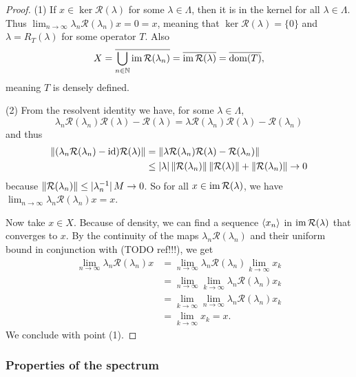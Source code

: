 \begin{proof}
(1) If $x\in \ker\mathcal{R}(\lambda)$ for some $\lambda\in\Lambda$, then it is in the kernel for all $\lambda\in\Lambda$. Thus $\lim_{n\to\infty}\lambda_n\mathcal{R}(\lambda_n)x = 0 = x$, meaning that $\ker\mathcal{R}(\lambda) = \{0\}$ and $\mathcal{\lambda} = R_T(\lambda)$ for some operator $T$. Also
\[ X = \overline{\bigcup_{n\in\mathbb{N}}\operatorname{im}\mathcal{R}(\lambda_n)} = \overline{\operatorname{im}\mathcal{R}(\lambda)} = \overline{\operatorname{dom}(T)}, \]
meaning $T$ is densely defined.

(2) From the resolvent identity we have, for some $\lambda\in \Lambda$,
\[ \lambda_n\mathcal{R}(\lambda_n)\mathcal{R}(\lambda) - \mathcal{R}(\lambda) = \lambda\mathcal{R}(\lambda_n)\mathcal{R}(\lambda) - \mathcal{R}(\lambda_n) \]
and thus
\begin{align*}
\lVert(\lambda_n\mathcal{R}(\lambda_n) - \operatorname{id})\mathcal{R}(\lambda)\rVert &= \lVert\lambda\mathcal{R}(\lambda_n)\mathcal{R}(\lambda) - \mathcal{R}(\lambda_n)\rVert \\
&\leq |\lambda|\,\lVert\mathcal{R}(\lambda_n)\rVert\,\lVert\mathcal{R}(\lambda)\rVert + \lVert\mathcal{R}(\lambda_n)\rVert \to 0
\end{align*}
because $\lVert\mathcal{R}(\lambda_n)\rVert \leq |\lambda_n^{-1}|\,M \to 0$. So for all $x\in\operatorname{im}\mathcal{R}(\lambda)$, we have $\lim_{n\to\infty}\lambda_n\mathcal{R}(\lambda_n)x = x$.

Now take $x\in X$. Because of density, we can find a sequence $\left\langle x_n \right\rangle$ in $\operatorname{im}\mathcal{R}(\lambda)$ that converges to $x$. By the continuity of the maps $\lambda_n\mathcal{R}(\lambda_n)$ and their uniform bound in conjunction with (TODO ref!!!), we get
\begin{align*}
\lim_{n\to\infty}\lambda_n\mathcal{R}(\lambda_n)x &= \lim_{n\to\infty}\lambda_n\mathcal{R}(\lambda_n)\lim_{k\to\infty}x_k \\
&= \lim_{n\to\infty}\lim_{k\to\infty}\lambda_n\mathcal{R}(\lambda_n)x_k \\
&= \lim_{k\to\infty}\lim_{n\to\infty}\lambda_n\mathcal{R}(\lambda_n)x_k \\
&= \lim_{k\to\infty}x_k = x.
\end{align*}
We conclude with point (1).
\end{proof}

\subsubsection{Properties of the spectrum}

